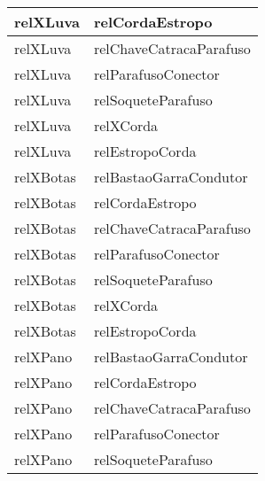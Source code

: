 \begin{center}
\begin{longtable}[H]{|l|l|}
relXLuva                                        & relCordaEstropo                                  \\ \hline
relXLuva                                        & relChaveCatracaParafuso                          \\ \hline
relXLuva                                        & relParafusoConector                              \\ \hline
relXLuva                                        & relSoqueteParafuso                               \\ \hline
relXLuva                                        & relXCorda                                        \\ \hline
relXLuva                                        & relEstropoCorda                                  \\ \hline
relXBotas                                       & relBastaoGarraCondutor                           \\ \hline
relXBotas                                       & relCordaEstropo                                  \\ \hline
relXBotas                                       & relChaveCatracaParafuso                          \\ \hline
relXBotas                                       & relParafusoConector                              \\ \hline
relXBotas                                       & relSoqueteParafuso                               \\ \hline
relXBotas                                       & relXCorda                                        \\ \hline
relXBotas                                       & relEstropoCorda                                  \\ \hline
relXPano                                        & relBastaoGarraCondutor                           \\ \hline
relXPano                                        & relCordaEstropo                                  \\ \hline
relXPano                                        & relChaveCatracaParafuso                          \\ \hline
relXPano                                        & relParafusoConector                              \\ \hline
relXPano                                        & relSoqueteParafuso                               \\ \hline

\end{longtable}
\end{center}
